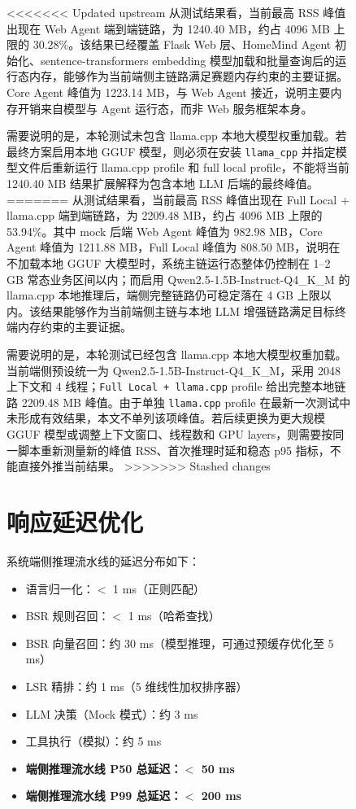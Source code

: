 \documentclass[12pt,a4paper,oneside]{ctexrep}
\begin{document}
\begin{figure}[H]
<<<<<<< Updated upstream
从测试结果看，当前最高 RSS 峰值出现在 Web Agent 端到端链路，为 1240.40 MB，约占 4096 MB 上限的 30.28\%。该结果已经覆盖 Flask Web 层、HomeMind Agent 初始化、sentence-transformers embedding 模型加载和批量查询后的运行态内存，能够作为当前端侧主链路满足赛题内存约束的主要证据。Core Agent 峰值为 1223.14 MB，与 Web Agent 接近，说明主要内存开销来自模型与 Agent 运行态，而非 Web 服务框架本身。

需要说明的是，本轮测试未包含 llama.cpp 本地大模型权重加载。若最终方案启用本地 GGUF 模型，则必须在安装 \texttt{llama\_cpp} 并指定模型文件后重新运行 llama.cpp profile 和 full local profile，不能将当前 1240.40 MB 结果扩展解释为包含本地 LLM 后端的最终峰值。
=======
从测试结果看，当前最高 RSS 峰值出现在 Full Local + llama.cpp 端到端链路，为 2209.48 MB，约占 4096 MB 上限的 53.94\%。其中 mock 后端 Web Agent 峰值为 982.98 MB，Core Agent 峰值为 1211.88 MB，Full Local 峰值为 808.50 MB，说明在不加载本地 GGUF 大模型时，系统主链运行态整体仍控制在 1--2 GB 常态业务区间以内；而启用 Qwen2.5-1.5B-Instruct-Q4\_K\_M 的 llama.cpp 本地推理后，端侧完整链路仍可稳定落在 4 GB 上限以内。该结果能够作为当前端侧主链与本地 LLM 增强链路满足目标终端内存约束的主要证据。

需要说明的是，本轮测试已经包含 llama.cpp 本地大模型权重加载。当前端侧预设统一为 Qwen2.5-1.5B-Instruct-Q4\_K\_M，采用 2048 上下文和 4 线程；\texttt{Full Local + llama.cpp} profile 给出完整本地链路 2209.48 MB 峰值。由于单独 \texttt{llama.cpp} profile 在最新一次测试中未形成有效结果，本文不单列该项峰值。若后续更换为更大规模 GGUF 模型或调整上下文窗口、线程数和 GPU layers，则需要按同一脚本重新测量新的峰值 RSS、首次推理时延和稳态 p95 指标，不能直接外推当前结果。
>>>>>>> Stashed changes

\section{响应延迟优化}

系统端侧推理流水线的延迟分布如下：

\begin{itemize}
    \item 语言归一化：$<$ 1 ms（正则匹配）
    \item BSR 规则召回：$<$ 1 ms（哈希查找）
    \item BSR 向量召回：约 30 ms（模型推理，可通过预缓存优化至 5 ms）
    \item LSR 精排：约 1 ms（5 维线性加权排序器）
    \item LLM 决策（Mock 模式）：约 3 ms
    \item 工具执行（模拟）：约 5 ms
    \item \textbf{端侧推理流水线 P50 总延迟：$<$ 50 ms}
    \item \textbf{端侧推理流水线 P99 总延迟：$<$ 200 ms}
\end{itemize}


\end{figure}
\end{document}
